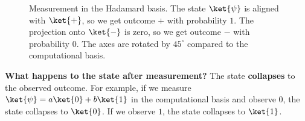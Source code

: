 \begin{itemize}
    \newpage

    \begin{figure}[!htp]
        \centering
        \caption{Measurement in the Hadamard basis. The state $\ket{\psi}$ is aligned with $\ket{+}$, so we get outcome $+$ with probability $1$. The projection onto $\ket{-}$ is zero, so we get outcome $-$ with probability $0$. The axes are rotated by $45^\circ$ compared to the computational basis.}
        \label{fig:measurement-hadamard}
    \end{figure}
\end{itemize}
\textcolor{Green3}{ \textbf{What happens to the state after measurement?}} The state \textbf{collapses} to the observed outcome. For example, if we measure $\ket{\psi} = a\ket{0} + b\ket{1}$ in the computational basis and observe $0$, the state collapses to $\ket{0}$. If we observe $1$, the state collapses to $\ket{1}$.

